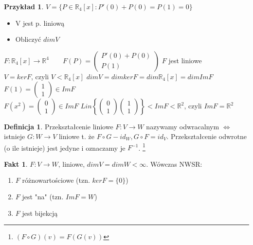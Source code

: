 \documentclass[12pt,a4paper]{article}
\newcommand{\RR}{\mathbb{R}}
\theoremstyle{plain}
\theoremstyle{definition}
\newtheorem{ft}{Fakt}[section]
\theoremstyle{definition}
\newtheorem{df}{Definicja}[section]
\theoremstyle{definition}
\theoremstyle{definition}
\theoremstyle{definition}
\theoremstyle{definition}
\newtheorem*{prz}{Przykład}
\theoremstyle{definition}
\theoremstyle{definition}
\theoremstyle{definition}
\begin{document}
\begin{prz}
    $ V = \{ P \in \RR_4[x] : P'(0) + P(0) = P(1) = 0 \}$ 
    \begin{itemize}
        \item V jest p. liniową
        \item Obliczyć $dim V$
    \end{itemize}
    $ F : \RR_4[x] \rightarrow \RR^4 
        \qquad F(P) = \begin{pmatrix} P'(0) + P(0) \\ P(1) \end{pmatrix} $ \quad $F$ jest liniowe \\
    $V = ker F$, czyli $V < \RR_4[x]$
    $dim V = dimker F = dim\RR_4 [x] = dimImF$ %
    $F(1) = \begin{pmatrix} 1 \\ 1 \end{pmatrix} \in Im F$ \\
    $F(x^2) = \begin{pmatrix} 0 \\ 1 \end{pmatrix} \in Im F$
    $Lin \left\{ \begin{pmatrix} 0 \\ 1 \end{pmatrix} \begin{pmatrix} 1 \\ 1 \end{pmatrix} \right\} < Im F < \RR^2 $, czyli
    $Im F = \RR^2$ %
\end{prz}

\begin{df} 
    Przekształcenie liniowe $F: V \rightarrow W $ nazywamy odwracalnym $\Leftrightarrow$ istnieje $G: W \rightarrow V$ liniowe t. że $F \circ G - id_W, G \circ F = id_V.$ Przekształcenie odwrotne (o ile istnieje) jest jedyne i oznaczamy je $F^{-1}$. \footnote{$(F \circ G)(v) = F(G(v))$}
\end{df}

\begin{ft} $F: V \rightarrow W $, liniowe, $dim V = dimW < \infty$. Wówczas NWSR:
    \begin{enumerate}[{(}1{)}]
        \item $F$ różnowartościowe (tzn. $kerF = \{0\}$)
        \item $F$ jest "na" (tzn. $Im F = W$)
        \item $F$ jest bijekcją
    \end{enumerate}
\end{ft}
\end{document}
